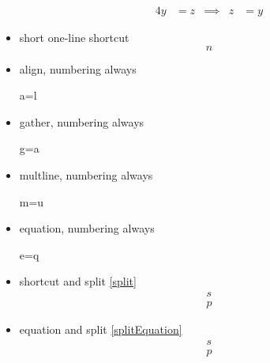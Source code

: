\documentclass{article}
\begin{document}
\begin{itemize}
\begin{alignat}{4}
				y &= z & \implies & z &= y \label{alignatReferenced}
			\end{alignat}
		\item short one-line shortcut \[n\]
		\item align, numbering always \begin{align+} a=l \end{align+}
		\item gather, numbering always \begin{gather+} g=a \end{gather+}
		\item multline, numbering always \begin{multline+} m=u \end{multline+}
		\item equation, numbering always \begin{equation+} e=q \end{equation+}
		\item shortcut and split \ref{split} \[ \label{split}\begin{split} s \\ p \end{split} \]
		\item equation and split \ref{splitEquation} \begin{equation} \label{splitEquation}\begin{split} s \\ p \end{split} \end{equation}
	\end{itemize}
\end{document}
